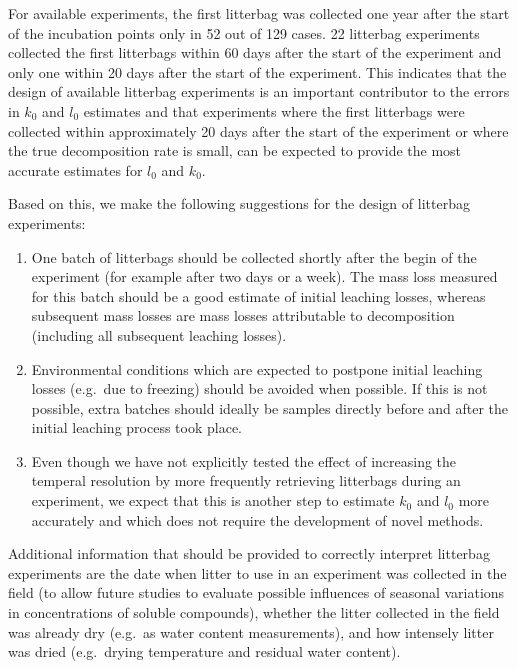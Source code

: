 \documentclass[bg, manuscript]{copernicus}
\begin{document}
For available experiments, the first litterbag was collected one year after the start of the incubation points only in 52 out of 129 cases. 22 litterbag experiments collected the first litterbags within 60 days after the start of the experiment and only one within 20 days after the start of the experiment. This indicates that the design of available litterbag experiments is an important contributor to the errors in \(k_0\) and \(l_0\) estimates and that experiments where the first litterbags were collected within approximately 20 days after the start of the experiment or where the true decomposition rate is small, can be expected to provide the most accurate estimates for \(l_0\) and \(k_0\).

Based on this, we make the following suggestions for the design of litterbag experiments:

\begin{enumerate}
\def\labelenumi{\arabic{enumi}.}
\item
  One batch of litterbags should be collected shortly after the begin of the experiment (for example after two days or a week). The mass loss measured for this batch should be a good estimate of initial leaching losses, whereas subsequent mass losses are mass losses attributable to decomposition (including all subsequent leaching losses).
\item
  Environmental conditions which are expected to postpone initial leaching losses (e.g.~due to freezing) should be avoided when possible. If this is not possible, extra batches should ideally be samples directly before and after the initial leaching process took place.
\item
  Even though we have not explicitly tested the effect of increasing the temperal resolution by more frequently retrieving litterbags during an experiment, we expect that this is another step to estimate \(k_0\) and \(l_0\) more accurately and which does not require the development of novel methods.
\end{enumerate}

Additional information that should be provided to correctly interpret litterbag experiments are the date when litter to use in an experiment was collected in the field (to allow future studies to evaluate possible influences of seasonal variations in concentrations of soluble compounds), whether the litter collected in the field was already dry (e.g.~as water content measurements), and how intensely litter was dried (e.g.~drying temperature and residual water content).
\end{document}
